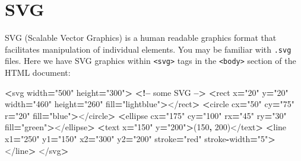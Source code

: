 \documentclass[openany]{book}
\newenvironment{Shaded}{\begin{snugshade}}{\end{snugshade}}
\newcommand{\DecValTok}[1]{\textcolor[rgb]{0.00,0.00,0.81}{#1}}
\newcommand{\NormalTok}[1]{#1}
\newcommand{\OperatorTok}[1]{\textcolor[rgb]{0.81,0.36,0.00}{\textbf{#1}}}
\newcommand{\StringTok}[1]{\textcolor[rgb]{0.31,0.60,0.02}{#1}}
\begin{document}
\hypertarget{svg}{%
\section{SVG }\label{svg}}

SVG (Scalable Vector Graphics) is a human readable graphics format that facilitates manipulation of individual elements. You may be familiar with \texttt{.svg} files. Here we have SVG graphics within \texttt{\textless{}svg\textgreater{}} tags in the \texttt{\textless{}body\textgreater{}} section of the HTML document:

\begin{Shaded}
\begin{Highlighting}[]
\OperatorTok{<}\NormalTok{svg width}\OperatorTok{=}\StringTok{"500"}\NormalTok{ height}\OperatorTok{=}\StringTok{"300"}\OperatorTok{>}  \OperatorTok{<!--}\NormalTok{ some SVG }\OperatorTok{-->}
    \OperatorTok{<}\NormalTok{rect x}\OperatorTok{=}\StringTok{"20"}\NormalTok{ y}\OperatorTok{=}\StringTok{"20"}\NormalTok{ width}\OperatorTok{=}\StringTok{"460"}\NormalTok{ height}\OperatorTok{=}\StringTok{"260"}\NormalTok{ fill}\OperatorTok{=}\StringTok{"lightblue"}\OperatorTok{>}\NormalTok{</rect}\OperatorTok{>}
    \OperatorTok{<}\NormalTok{circle cx}\OperatorTok{=}\StringTok{"50"}\NormalTok{ cy}\OperatorTok{=}\StringTok{"75"}\NormalTok{ r}\OperatorTok{=}\StringTok{"20"}\NormalTok{ fill}\OperatorTok{=}\StringTok{"blue"}\OperatorTok{>}\NormalTok{</circle}\OperatorTok{>}
    \OperatorTok{<}\NormalTok{ellipse cx}\OperatorTok{=}\StringTok{"175"}\NormalTok{ cy}\OperatorTok{=}\StringTok{"100"}\NormalTok{ rx}\OperatorTok{=}\StringTok{"45"}\NormalTok{ ry}\OperatorTok{=}\StringTok{"30"}\NormalTok{ fill}\OperatorTok{=}\StringTok{"green"}\OperatorTok{>}\NormalTok{</ellipse}\OperatorTok{>}
    \OperatorTok{<}\NormalTok{text x}\OperatorTok{=}\StringTok{"150"}\NormalTok{ y}\OperatorTok{=}\StringTok{"200"}\OperatorTok{>}\NormalTok{(}\DecValTok{150}\OperatorTok{,} \DecValTok{200}\NormalTok{)</text}\OperatorTok{>}
    \OperatorTok{<}\NormalTok{line x1}\OperatorTok{=}\StringTok{"250"}\NormalTok{ y1}\OperatorTok{=}\StringTok{"150"}\NormalTok{ x2}\OperatorTok{=}\StringTok{"300"}\NormalTok{ y2}\OperatorTok{=}\StringTok{"200"}\NormalTok{ stroke}\OperatorTok{=}\StringTok{"red"}\NormalTok{ stroke}\OperatorTok{-}\NormalTok{width}\OperatorTok{=}\StringTok{"5"}\OperatorTok{>}\NormalTok{</line}\OperatorTok{>}
\NormalTok{</svg}\OperatorTok{>}
\end{Highlighting}
\end{Shaded}
\end{document}
